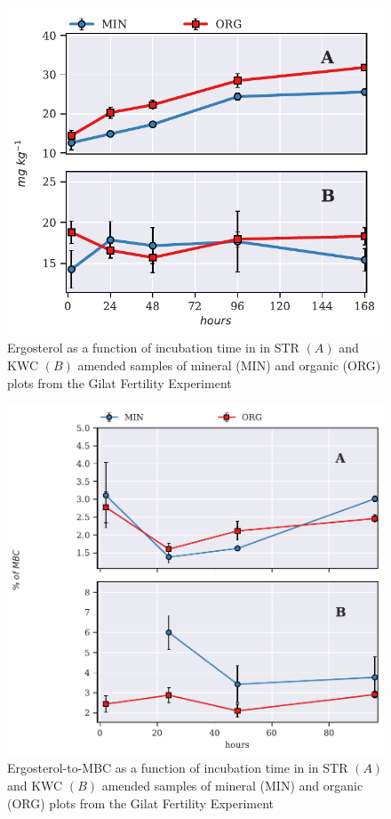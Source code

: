 			 \begin{figure}[H]
				\centering
				\includegraphics[width=\linewidth]{thesis_figures/preliminary/treated/Erg.pdf}
				\caption{Ergosterol  as a function of incubation time in in STR $\left(A\right)$ and KWC $\left(B\right)$ amended samples of mineral (MIN) and organic (ORG) plots from the Gilat Fertility Experiment}
				\label{fig:erg_treated_preliminary}
			\end{figure}

			\begin{figure}[H]
				\centering
				\includegraphics[width=\linewidth]{thesis_figures/preliminary/treated/Erg-to-MBC.pdf}
				\caption{Ergosterol-to-MBC  as a function of incubation time in in STR $\left(A\right)$ and KWC $\left(B\right)$ amended samples of mineral (MIN) and organic (ORG) plots from the Gilat Fertility Experiment}
				\label{fig:erg_to_mbc_treated_preliminary}
			\end{figure}




